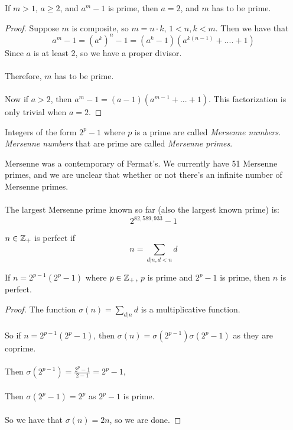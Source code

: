 \begin{lemma}
If $m > 1$, $a \geq 2$, and $a^m - 1$ is prime, then $a = 2$, and $m$ has to be prime.
\end{lemma}

\begin{proof}
Suppose $m$ is composite, so $m = n \cdot k$, $1 < n, k < m$. Then we have that
\[a^m - 1 = (a^k)^n - 1 = (a^k - 1)(a^{k(n-1)} + .... + 1)\]
Since $a$ is at least 2, so we have a proper divisor.\\\\
Therefore, $m$ has to be prime.\\\\
Now if $a > 2$, then $a^m - 1 = (a - 1)(a^{m - 1} + ... + 1)$. This factorization is only trivial when $a = 2$.
\end{proof}

\begin{definition}
Integers of the form $2^p - 1$ where $p$ is a prime are called \textit{Mersenne numbers}. \textit{Mersenne numbers} that are prime are called \textit{Mersenne primes}.
\end{definition}

\begin{remark}
Mersenne was a contemporary of Fermat's. We currently have 51 Mersenne primes, and we are unclear that whether or not there's an infinite number of Mersenne primes.\\\\
The largest Mersenne prime known so far (also the largest known prime) is:
\[2^{82,589,933} - 1\]
\end{remark}

\begin{definition}
$n \in \mathbb{Z}_+$ is perfect if
\[n = \sum_{d | n, d < n} d\]
\end{definition}

\begin{proposition}
If $n = 2^{p-1}(2^{p} - 1)$ where $p \in \mathbb{Z}_+$, $p$ is prime and $2^{p} - 1$ is prime, then $n$ is perfect.
\end{proposition}

\begin{proof}
The function $\sigma(n) = \sum_{d | n} d$ is a multiplicative function.\\\\
So if $n = 2^{p-1}(2^p - 1)$, then $\sigma(n) = \sigma(2^{p-1})\sigma(2^p-1)$ as they are coprime.\\\\
Then $\sigma(2^{p-1}) = \frac{2^p-1}{2-1} = 2^{p} - 1$,\\\\
Then $\sigma(2^{p} - 1) = 2^{p}$ as $2^{p} - 1$ is prime.\\\\
So we have that $\sigma(n) = 2n$, so we are done.
\end{proof}

